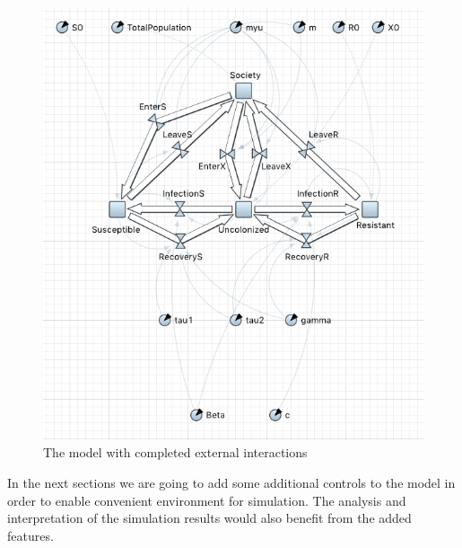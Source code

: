 \begin{figure}[H]
  \centering
  \includegraphics[height=0.6\textwidth]{img/screens/society/society21}
  \caption{The model with completed external interactions}
\end{figure}

In the next sections we are going to add some additional controls to the model in order to enable convenient environment for simulation. The analysis and interpretation of the simulation results would also benefit from the added features.